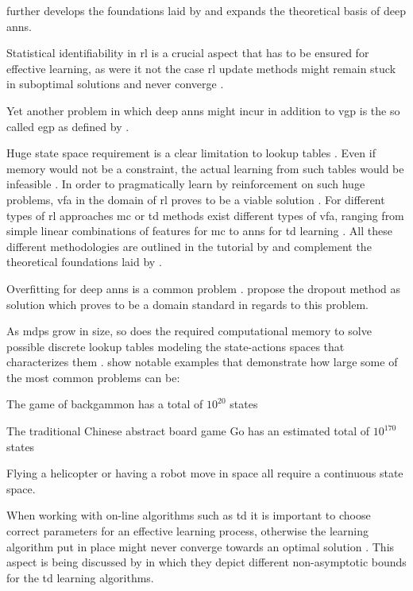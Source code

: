 \citet{Bengio2009} further develops the foundations laid by \citet{Lecun1998} and expands the theoretical basis of deep \glspl{ann}.

Statistical identifiability in \gls{rl} is a crucial aspect that has to be ensured for effective learning, as were it not the case \gls{rl} update methods might remain stuck in suboptimal solutions and never converge \citep{Zhang2011}.

Yet another problem in which deep \glspl{ann} might incur in addition to \gls{vgp} is the so called \gls{egp} as defined by \citet{Pascanu2012}.

Huge state space requirement is a clear limitation to lookup tables \citep{Sutton2017}. Even if memory would not be a constraint, the actual learning from such tables would be infeasible \citep{Sutton2017}. In order to pragmatically learn by reinforcement on such huge problems, \gls{vfa} in the domain of \gls{rl} proves to be a viable solution \citep{Sutton2017}. For different types of \gls{rl} approaches \ie \gls{mc} or \gls{td} methods exist different types of \gls{vfa}, ranging from simple linear combinations of features for \gls{mc} to \glspl{ann} for \gls{td} learning \citep{Sutton2017}. All these different methodologies are outlined in the tutorial by \citet{Geramifard2013} and complement the theoretical foundations laid by \citet{Sutton2017}.

Overfitting for deep \glspl{ann} is a common problem \citep[p. 218]{Sutton2017}. \citet{Srivastava2014} propose the dropout method as solution which proves to be a domain standard in regards to this problem.

As \glspl{mdp} grow in size, so does the required computational memory to solve possible discrete lookup tables modeling the state-actions spaces that characterizes them \citep{Sutton2017}. \citet{Sutton2017} show notable examples that demonstrate how large some of the most common problems can be:
\begin{enumerate*}
	\item The game of backgammon has a total of $10^{20}$ states
	\item The traditional Chinese abstract board game Go has an estimated total of $10^{170}$ states
	\item Flying a helicopter or having a robot move in space all require a continuous state space.
\end{enumerate*}

When working with on-line algorithms such as \gls{td} it is important to choose correct parameters for an effective learning process, otherwise the learning algorithm put in place might never converge towards an optimal solution \citep{Sutton2017}. This aspect is being discussed by \citet{Korda2014} in which they depict different non-asymptotic bounds for the \gls{td} learning algorithms.

